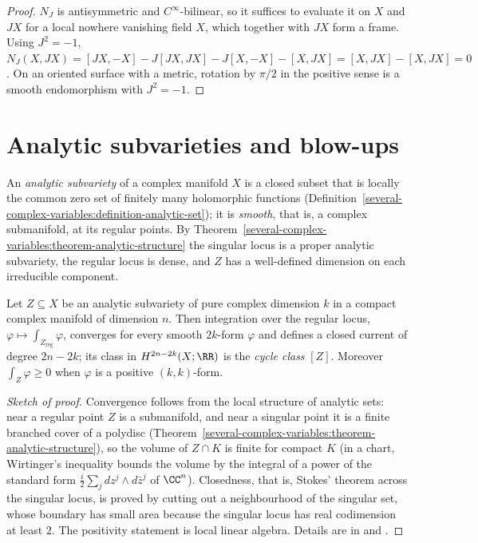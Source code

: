\begin{proof}
$N_J$ is antisymmetric and $C^\infty$-bilinear, so it suffices to evaluate it on $X$ and $JX$ for a local nowhere vanishing field $X$, which together with $JX$ form a frame. Using $J^2 = -1$,
$N_J(X, JX) = [JX, -X] - J[JX, JX] - J[X, -X] - [X, JX] = [X, JX] - [X, JX] = 0$. On an oriented surface with a metric, rotation by $\pi/2$ in the positive sense is a smooth endomorphism with $J^2 = -1$.
\end{proof}

\section{Analytic subvarieties and blow-ups}\label{complex-manifolds:section-subvarieties}

\begin{definition}\label{complex-manifolds:definition-analytic-subvariety}
An \emph{analytic subvariety} of a complex manifold $X$ is a closed subset that is locally the common zero set of finitely many holomorphic functions (Definition~\ref{several-complex-variables:definition-analytic-set});
it is \emph{smooth}, that is, a complex submanifold, at its regular points. By Theorem~\ref{several-complex-variables:theorem-analytic-structure} the singular locus is a proper analytic subvariety, the regular
locus is dense, and $Z$ has a well-defined dimension on each irreducible component.
\end{definition}

\begin{proposition}\label{complex-manifolds:proposition-subvariety-class}
Let $Z \subseteq X$ be an analytic subvariety of pure complex dimension $k$ in a compact complex manifold of dimension $n$. Then integration over the regular locus,
$\varphi \mapsto \int_{Z_{\mathrm{reg}}}\varphi$, converges for every smooth $2k$-form $\varphi$ and defines a closed current of degree $2n - 2k$; its class in $H^{2n-2k}(X; \RR)$ is the \emph{cycle class} $[Z]$.
Moreover $\int_Z\varphi \geq 0$ when $\varphi$ is a positive $(k,k)$-form.
\end{proposition}

\begin{proof}[Sketch of proof]
Convergence follows from the local structure of analytic sets: near a regular point $Z$ is a submanifold, and near a singular point it is a finite branched cover of a polydisc
(Theorem~\ref{several-complex-variables:theorem-analytic-structure}), so the volume of $Z \cap K$ is finite for compact $K$ (in a chart, Wirtinger's inequality bounds the volume by the integral of a power of the
standard form $\frac{i}{2}\sum_jdz^j \wedge d\bar z^j$ of $\CC^n$). Closedness, that is, Stokes' theorem across the singular locus, is proved by cutting out a neighbourhood of the singular set, whose boundary
has small area because the singular locus has real codimension at least $2$. The positivity statement is local linear algebra. Details are in \cite[Chapter 0, Section 2]{griffiths-harris} and
\cite[Chapter 11]{voisin-hodge-1}.
\end{proof}

